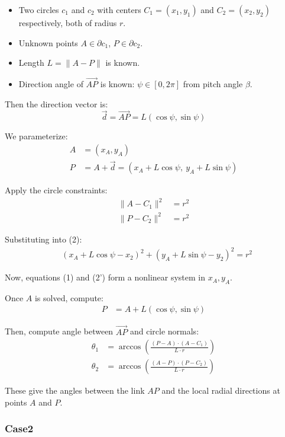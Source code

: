 \documentclass[11pt]{article}
\begin{document}
\begin{itemize}
    \item Two circles $c_1$ and $c_2$ with centers $C_1 = (x_1, y_1)$ and $C_2 = (x_2, y_2)$ respectively, both of radius $r$.
    \item Unknown points $A \in \partial c_1$, $P \in \partial c_2$.
    \item Length $L = \|A - P\|$ is known.
    \item Direction angle of $\vec{AP}$ is known: $\psi \in [0, 2\pi]$ from pitch angle \(\beta\).
\end{itemize}

Then the direction vector is:
\[
\vec{d} = \vec{AP} = L(\cos \psi, \sin \psi)
\]

We parameterize:
\begin{align*}
A &= (x_A, y_A) \\
P &= A + \vec{d} = (x_A + L \cos \psi,\ y_A + L \sin \psi)
\end{align*}

Apply the circle constraints:
\begin{align*}
\|A - C_1\|^2 &= r^2 \tag{1} \\
\|P - C_2\|^2 &= r^2 \tag{2}
\end{align*}

Substituting into (2):
\begin{align*}
&\left( x_A + L \cos \psi - x_2 \right)^2 + \left( y_A + L \sin \psi - y_2 \right)^2 = r^2 \tag{2'}
\end{align*}

Now, equations (1) and (2') form a nonlinear system in $x_A, y_A$.

Once $A$ is solved, compute:
\begin{align*}
P &= A + L(\cos \psi, \sin \psi)
\end{align*}

Then, compute angle between $\vec{AP}$ and circle normals:
\begin{align*}
\theta_1 &= \arccos\left( \frac{(P - A) \cdot (A - C_1)}{L \cdot r} \right) \\
\theta_2 &= \arccos\left( \frac{(A - P) \cdot (P - C_2)}{L \cdot r} \right)
\end{align*}

These give the angles between the link $AP$ and the local radial directions at points $A$ and $P$.

\subsubsection*{Case2}
\end{document}
